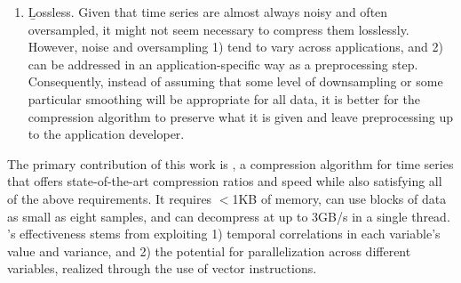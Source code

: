 \begin{enumerate}
\item \b{Lossless}. Given that time series are almost always noisy and often oversampled, it might not seem necessary to compress them losslessly. However, noise and oversampling 1) tend to vary across applications, and 2) can be addressed in an application-specific way as a preprocessing step. Consequently, instead of assuming that some level of downsampling or some particular smoothing will be appropriate for all data, it is better for the compression algorithm to preserve what it is given and leave preprocessing up to the application developer.
\end{enumerate}


The primary contribution of this work is \mine,
a compression algorithm for time series that offers state-of-the-art compression ratios and speed while also satisfying all of the above requirements. It requires $<$1KB of memory, can use blocks of data as small as eight samples, and can decompress at up to 3GB/s in a single thread. \mine's effectiveness stems from exploiting 1) temporal correlations in each variable's value and variance, and 2) the potential for parallelization across different variables, realized through the use of vector instructions.

